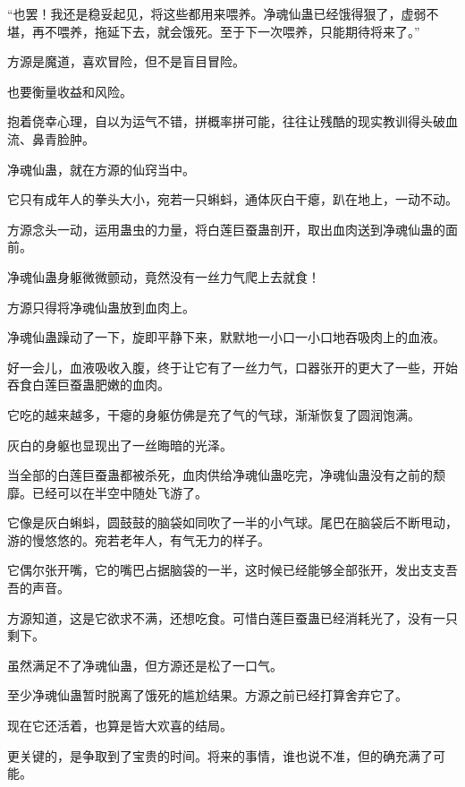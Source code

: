 
\begin{this_body}



“也罢！我还是稳妥起见，将这些都用来喂养。净魂仙蛊已经饿得狠了，虚弱不堪，再不喂养，拖延下去，就会饿死。至于下一次喂养，只能期待将来了。”

方源是魔道，喜欢冒险，但不是盲目冒险。

也要衡量收益和风险。

抱着侥幸心理，自以为运气不错，拼概率拼可能，往往让残酷的现实教训得头破血流、鼻青脸肿。

净魂仙蛊，就在方源的仙窍当中。

它只有成年人的拳头大小，宛若一只蝌蚪，通体灰白干瘪，趴在地上，一动不动。

方源念头一动，运用蛊虫的力量，将白莲巨蚕蛊剖开，取出血肉送到净魂仙蛊的面前。

净魂仙蛊身躯微微颤动，竟然没有一丝力气爬上去就食！

方源只得将净魂仙蛊放到血肉上。

净魂仙蛊躁动了一下，旋即平静下来，默默地一小口一小口地吞吸肉上的血液。

好一会儿，血液吸收入腹，终于让它有了一丝力气，口器张开的更大了一些，开始吞食白莲巨蚕蛊肥嫩的血肉。

它吃的越来越多，干瘪的身躯仿佛是充了气的气球，渐渐恢复了圆润饱满。

灰白的身躯也显现出了一丝晦暗的光泽。

当全部的白莲巨蚕蛊都被杀死，血肉供给净魂仙蛊吃完，净魂仙蛊没有之前的颓靡。已经可以在半空中随处飞游了。

它像是灰白蝌蚪，圆鼓鼓的脑袋如同吹了一半的小气球。尾巴在脑袋后不断甩动，游的慢悠悠的。宛若老年人，有气无力的样子。

它偶尔张开嘴，它的嘴巴占据脑袋的一半，这时候已经能够全部张开，发出支支吾吾的声音。

方源知道，这是它欲求不满，还想吃食。可惜白莲巨蚕蛊已经消耗光了，没有一只剩下。

虽然满足不了净魂仙蛊，但方源还是松了一口气。

至少净魂仙蛊暂时脱离了饿死的尴尬结果。方源之前已经打算舍弃它了。

现在它还活着，也算是皆大欢喜的结局。

更关键的，是争取到了宝贵的时间。将来的事情，谁也说不准，但的确充满了可能。


\end{this_body}
